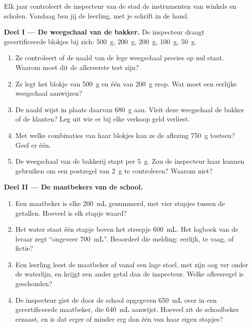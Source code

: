\begin{problem}\label{pb:g6:measurement-in-science:1}
Elk jaar controleert de inspecteur van de stad de instrumenten van
winkels en scholen. Vandaag ben jij de leerling, met je schrift in de
hand.

\medskip\noindent\textbf{Deel I --- De weegschaal van de bakker.}
De inspecteur draagt gecertificeerde blokjes bij zich: \qty{500}{g},
\qty{200}{g}, \qty{200}{g}, \qty{100}{g}, \qty{50}{g}.
\begin{enumerate}
  \item Ze controleert of de naald van de lege weegschaal precies op
        nul staat. Waarom moet dit de allereerste test zijn?
  \item Ze legt het blokje van \qty{500}{g} en één van \qty{200}{g}
        erop. Wat moet een eerlijke weegschaal aanwijzen?
  \item De naald wijst in plaats daarvan \qty{680}{g} aan. Vleit deze
        weegschaal de bakker of de klanten? Leg uit wie er bij elke
        verkoop geld verliest.
  \item Met welke combinaties van haar blokjes kan ze de aflezing
        \qty{750}{g} toetsen? Geef er één.
  \item De weegschaal van de bakkerij stapt per \qty{5}{g}. Zou de
        inspecteur haar kunnen gebruiken om een postzegel van
        \qty{2}{g} te controleren? Waarom niet?
\end{enumerate}

\medskip\noindent\textbf{Deel II --- De maatbekers van de school.}
\begin{enumerate}[resume]
  \item Een maatbeker is elke \qty{200}{mL} genummerd, met vier
        stapjes tussen de getallen. Hoeveel is elk stapje waard?
  \item Het water staat één stapje boven het streepje \qty{600}{mL}.
        Het logboek van de leraar zegt ``ongeveer \qty{700}{mL}''.
        Beoordeel die melding: eerlijk, te vaag, of fictie?
  \item Een leerling leest de maatbeker af vanaf een lage stoel, met
        zijn oog ver onder de waterlijn, en krijgt een ander getal
        dan de inspecteur. Welke afleesregel is geschonden?
  \item De inspecteur giet de door de school opgegeven \qty{650}{mL}
        over in een gecertificeerde maatbeker, die \qty{640}{mL}
        aanwijst. Hoeveel zit de schoolbeker ernaast, en is dat erger
        of minder erg dan één van haar eigen stapjes?
\end{enumerate}


\end{problem}
